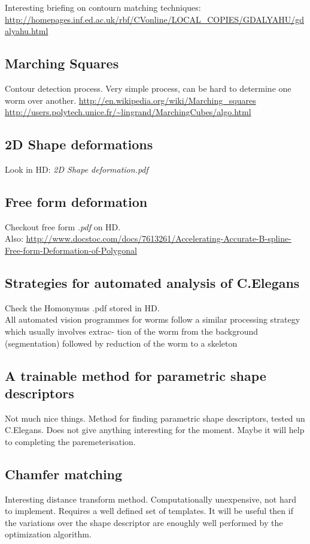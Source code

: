 \documentclass{article}
\begin{document}
Interesting briefing on contourn matching techniques:
\url{http://homepages.inf.ed.ac.uk/rbf/CVonline/LOCAL_COPIES/GDALYAHU/gdalyahu.html}

\subsection{Marching Squares}
Contour detection process. Very simple process, can be hard to determine one 
worm over another.
\url{http://en.wikipedia.org/wiki/Marching_squares}
\url{http://users.polytech.unice.fr/~lingrand/MarchingCubes/algo.html}

\subsection{2D Shape deformations}
Look in HD: \emph{2D Shape deformation.pdf}


\subsection{Free form deformation}
Checkout free form \emph{.pdf} on HD.\\
Also: 
\url{http://www.docstoc.com/docs/7613261/Accelerating-Accurate-B-spline-Free-form-Deformation-of-Polygonal}



\subsection{Strategies for automated analysis of C.Elegans}
Check the Homonymus .pdf stored in HD.\\

All automated vision programmes for worms follow a
similar processing strategy which usually involves extrac-
tion of the worm from the background (segmentation)
followed by reduction of the worm to a skeleton \\


\subsection{A trainable method for parametric shape descriptors}
Not much nice things. Method for finding parametric shape descriptors, tested un C.Elegans.
Does not give anything interesting for the moment. Maybe it will help to completing 
the paremeterisation.

\subsection{Chamfer matching}
Interesting distance transform method. Computationally unexpensive, not hard to implement.
Requires a well defined set of templates. It will be useful then if the variations over the shape 
descriptor are enoughly well performed by the optimization algorithm. 
\end{document}
